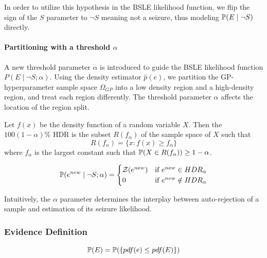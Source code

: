 In order to utilize this hypothesis in the BSLE likelihood function, we flip the sign of the $S$ parameter to $\neg S$ meaning not a seizure, thus modeling $\mathbb{P}(E \mid \neg S)$ directly.

\paragraph{Partitioning with a threshold $\alpha$}
A new threshold parameter $\alpha$ is introduced to guide the BSLE likelihood function $P(E \mid \neg S ; \alpha)$. Using the density estimator $\hat{p}(e)$, we partition the GP-hyperparameter sample space $\Omega_{GP}$ into a low density region and a high-density region, and treat each region differently. The threshold parameter $\alpha$ affects the location of the region split.

\begin{definition}
    Let $f(x)$ be the density function of a random variable $X$. Then the $100(1-\alpha)\%$ HDR is the subset $R(f_\alpha)$ of the sample space of $X$ such that
    $$R(f_\alpha) = \{ x : f(x) \ge f_\alpha \}$$
    where $f_\alpha$ is the largest constant such that $\mathbb{P}(X \in R(f_\alpha)) \ge 1-\alpha$.
\end{definition}
 
\begin{definition}

\begin{equation}
\label{eq:c3bsle:likelihood}
\mathbb{P}(e^{new} \mid \neg S ; \alpha) = \begin{cases}
\mathcal{Z}(e^{new}) &\text{if $e^{new} \in HDR_\alpha$}\\
0 &\text{if $e^{new} \notin HDR_\alpha$}
\end{cases}
\end{equation}

Intuitively, the $\alpha$ parameter determines the interplay between auto-rejection of a sample and estimation of its seizure likelihood. 
\end{definition}



\subsubsection{Evidence Definition}
\begin{definition}
    \begin{equation}
    \label{eq:c3bsle:evidence}
    \mathbb{P}(E) = \mathbb{P}(\{pdf(e) \leq pdf(E)\})
    \end{equation}
\end{definition}


